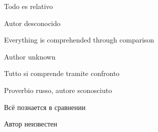 \ifdefined\SPANISH
{}

\epigraph{Todo es relativo}{Autor desconocido}
\fi %

\ifdefined\ENGLISH
{}

\epigraph{Everything is comprehended through comparison}{Author unknown}
\fi %

\ifdefined\ITALIAN
{}

\epigraph{Tutto si comprende tramite confronto}{Proverbio russo, autore sconosciuto}
\fi %

\ifdefined\RUSSIAN
{}
\epigraph{Всё познается в сравнении}{Автор неизвестен}
\fi %

\ifdefined\BRAZILIAN
{}
\fi %

\ifdefined\THAI
{}
\fi %

\EN{}
\ES{}
\ITA{}
\PTBR{}
\RU{}
\THA{}

\ES{\ESph{}}
\PTBR{\PTBRph{}}
\THA{\THAph{}}

\EN{}
\ES{}
\ITA{}
\PTBR{}
\RU{}

\EN{}
\ITA{}

